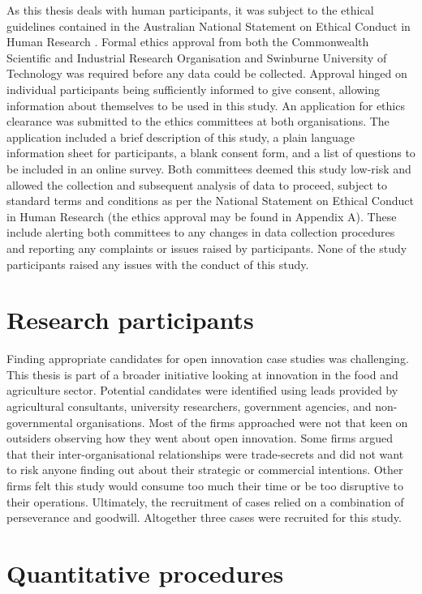 As this thesis deals with human participants, it was subject to the ethical guidelines contained in the Australian National Statement on Ethical Conduct in Human Research \citep{national2007national}. Formal ethics approval from both the Commonwealth Scientific and Industrial Research Organisation and Swinburne University of Technology was required before any data could be collected. Approval hinged on individual participants being sufficiently informed to give consent, allowing information about themselves to be used in this study. An application for ethics clearance was submitted to the ethics committees at both organisations. The application included a brief description of this study, a plain language information sheet for participants, a blank consent form, and a list of questions to be included in an online survey. Both committees deemed this study low-risk and allowed the collection and subsequent analysis of data to proceed, subject to standard terms and conditions as per the National Statement on Ethical Conduct in Human Research (the ethics approval may be found in Appendix A). These include alerting both committees to any changes in data collection procedures and reporting any complaints or issues raised by participants. None of the study participants raised any issues with the conduct of this study. 

\section{Research participants}

Finding appropriate candidates for open innovation case studies was challenging. This thesis is part of a broader initiative looking at innovation in the food and agriculture sector. Potential candidates were identified using leads provided by agricultural consultants, university researchers, government agencies, and non-governmental organisations. Most of the firms approached were not that keen on outsiders observing how they went about open innovation. Some firms argued that their inter-organisational relationships were trade-secrets and did not want to risk anyone finding out about their strategic or commercial intentions. Other firms felt this study would consume too much their time or be too disruptive to their operations. Ultimately, the recruitment of cases relied on a combination of perseverance and goodwill. Altogether three cases were recruited for this study. 

\section{Quantitative procedures}

